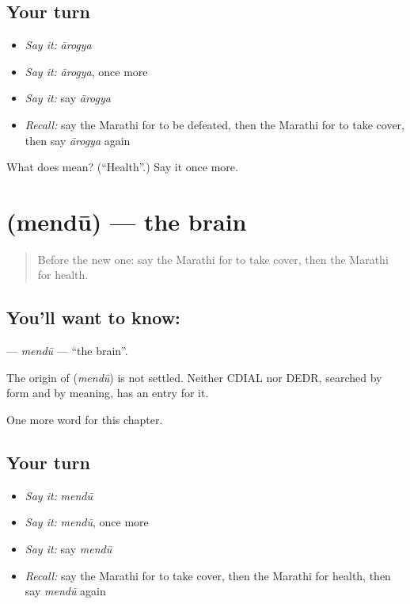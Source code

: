 \subsection*{Your turn}
\begin{itemize}
\raggedright
  \item \emph{Say it:} \emph{ārogya}
  \item \emph{Say it:} \emph{ārogya}, once more
  \item \emph{Say it:} say \emph{ārogya}
  \item \emph{Recall:} say the Marathi for to be defeated, then the Marathi for to take cover, then say \emph{ārogya} again
\end{itemize}

\begin{tcolorbox}[breakable,colback=teal!4,colframe=teal!35!black,title={Before you move on}]
What does  mean? (\textquotedblleft{}Health\textquotedblright{}.) Say it once more.
\end{tcolorbox}
\section[\texorpdfstring{\mr{मेंदू} (mendū)}{मेंदू (mendū)}]{ (mendū) — the brain}

\label{lesson:MR-C169-mendu}



\begin{quote}
Before the new one: say the Marathi for to take cover, then the Marathi for health.
\end{quote}

\subsection*{You'll want to know: }
\textbf{} — \emph{mendū} — \textquotedblleft{}the brain\textquotedblright{}.

\begin{cousinweb}
The origin of \textbf{} (\emph{mendū}) is not settled. Neither CDIAL nor DEDR, searched by form and by meaning, has an entry for it.
\end{cousinweb}

\begin{grammarlens}[title={What you've built}]
One more word for this chapter.
\end{grammarlens}

\subsection*{Your turn}
\begin{itemize}
\raggedright
  \item \emph{Say it:} \emph{mendū}
  \item \emph{Say it:} \emph{mendū}, once more
  \item \emph{Say it:} say \emph{mendū}
  \item \emph{Recall:} say the Marathi for to take cover, then the Marathi for health, then say \emph{mendū} again
\end{itemize}

